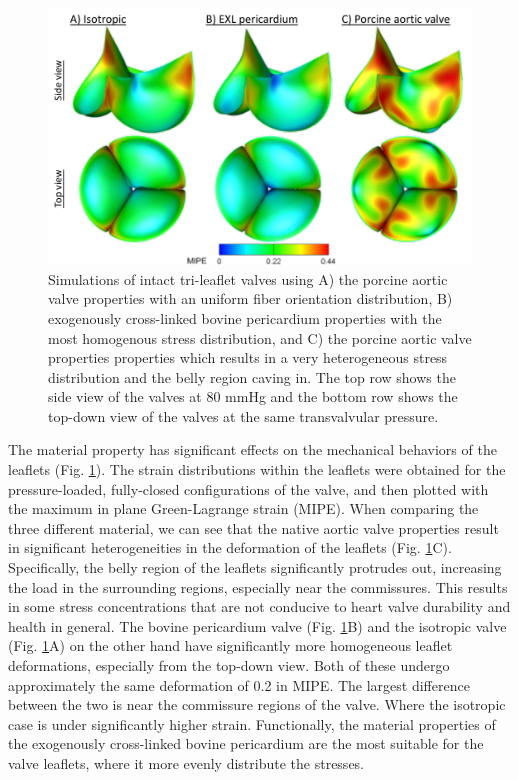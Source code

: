 	
\begin{figure}
\centering
\includegraphics[width=\textwidth]{Images/chapter5/valvesimulations}
\caption{Simulations of intact tri-leaflet valves using A) the porcine aortic valve properties with an uniform fiber orientation distribution, B) exogenously cross-linked bovine pericardium properties with the most homogenous stress distribution, and C) the porcine aortic valve properties properties which results in a very heterogeneous stress distribution and the belly region caving in. The top row shows the side view of the valves at 80 mmHg and the bottom row shows the top-down view of the valves at the same transvalvular pressure.}
\label{fig:valvesimulations}
\end{figure}
    
    The material property has significant effects on the mechanical behaviors of the leaflets (Fig. \ref{fig:valvesimulations}). The strain distributions within the leaflets were obtained for the pressure-loaded, fully-closed configurations of the valve, and then plotted with the maximum in plane Green-Lagrange strain (MIPE). When comparing the three different material, we can see that the native aortic valve properties result in significant heterogeneities in the deformation of the leaflets (Fig. \ref{fig:valvesimulations}C). Specifically, the belly region of the leaflets significantly protrudes out, increasing the load in the surrounding regions, especially near the commissures. This results in some stress concentrations that are not conducive to heart valve durability and health in general. The bovine pericardium valve (Fig. \ref{fig:valvesimulations}B) and the isotropic valve (Fig. \ref{fig:valvesimulations}A) on the other hand have significantly more homogeneous leaflet deformations, especially from the top-down view. Both of these undergo approximately the same deformation of 0.2 in MIPE. The largest difference between the two is near the commissure regions of the valve. Where the isotropic case is under significantly higher strain. Functionally, the material properties of the exogenously cross-linked bovine pericardium are the most suitable for the valve leaflets, where it more evenly distribute the stresses. 
    
